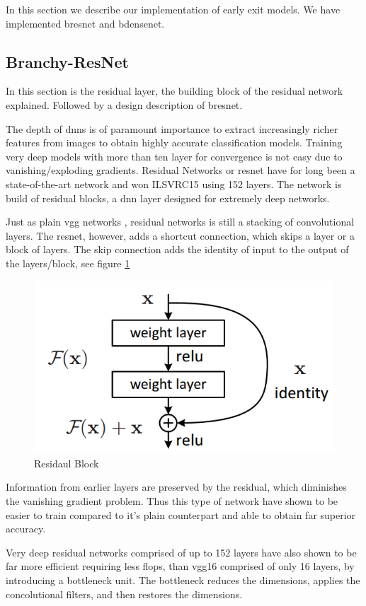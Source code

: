 In this section we describe our implementation of early exit models. We have implemented \gls{bresnet} and \gls{bdensenet}.  

\subsection{Branchy-ResNet} 

In this section is the residual layer, the building block of the residual network explained. Followed by a design description of \gls{bresnet}.

The depth of \gls{dnn}s is of paramount importance to extract increasingly richer features from images to obtain highly accurate classification models. Training very deep models with more than ten layer for convergence is not easy due to vanishing/exploding gradients. Residual Networks or \gls{resnet} \cite{he_deep_2015} have for long been a state-of-the-art network and won ILSVRC15 using 152 layers. The network is build of residual blocks, a \gls{dnn} layer designed for extremely deep networks. 

Just as plain \gls{vgg} networks \cite{simonyan_very_2015}, residual networks is still a stacking of convolutional layers. The \gls{resnet}, however, adds a shortcut connection, which skips a layer or a block of layers. The skip connection adds the identity of input to the output of the layers/block, see figure \ref{fig:residualblock}

\begin{figure}
	\centering
	\includegraphics[width=.5\linewidth]{figures/models/residualblock}
	\caption[Residual Block]{Residaul Block}
	\label{fig:residualblock}
\end{figure}

Information from earlier layers are preserved by the residual, which diminishes the vanishing gradient problem. Thus this type of network have shown to be easier to train compared to it’s plain counterpart and able to obtain far superior accuracy.  

Very deep residual networks comprised of up to 152 layers have also shown to be far more efficient requiring less \gls{flop}s, than \gls{vgg}16 comprised of only 16 layers, by introducing a bottleneck unit. The bottleneck reduces the dimensions, applies the concolutional filters, and then restores the dimensions.

